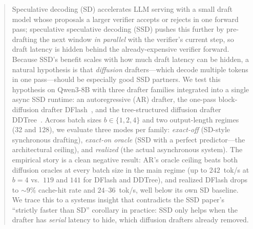 \documentclass{article}
\begin{document}

\begin{abstract}
Speculative decoding (SD) accelerates LLM serving with a small draft model whose proposals a larger verifier accepts or rejects in one forward pass; speculative speculative decoding (SSD) pushes this further by pre-drafting the next window \emph{in parallel} with the verifier's current step, so draft latency is hidden behind the already-expensive verifier forward.
Because SSD's benefit scales with how much draft latency can be hidden, a natural hypothesis is that \emph{diffusion} drafters---which decode multiple tokens in one pass---should be especially good SSD partners.
We test this hypothesis on Qwen3-8B with three drafter families integrated into a single async SSD runtime: an autoregressive (AR) drafter, the one-pass block-diffusion drafter DFlash~\citep{dflash2025}, and the tree-structured diffusion drafter DDTree~\citep{ringel2026ddtree}.
Across batch sizes $b\in\{1,2,4\}$ and two output-length regimes (32 and 128), we evaluate three modes per family: \emph{exact-off} (SD-style synchronous drafting), \emph{exact-on oracle} (SSD with a perfect predictor---the architectural ceiling), and \emph{realized} (the actual asynchronous system).
The empirical story is a clean negative result: AR's oracle ceiling beats both diffusion oracles at every batch size in the main regime (up to $242$~tok/s at $b{=}4$ vs.\ $119$ and $141$ for DFlash and DDTree), and realized DFlash drops to ${\sim}9\%$ cache-hit rate and $24$--$36$~tok/s, well below its own SD baseline.
We trace this to a systems insight that contradicts the SSD paper's ``strictly faster than SD'' corollary in practice: SSD only helps when the drafter has \emph{serial} latency to hide, which diffusion drafters already removed.
\end{abstract}
\end{document}
